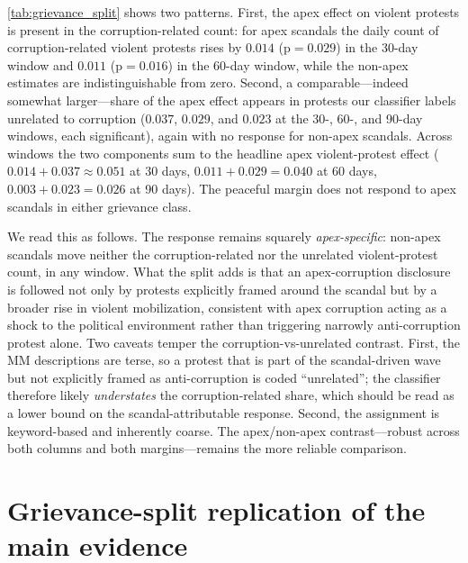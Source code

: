 \documentclass[11pt]{article}
\begin{document}
\autoref{tab:grievance_split} shows two patterns. First, the apex effect on violent protests is present in the corruption-related count: for apex scandals the daily count of corruption-related violent protests rises by $0.014$ (p$=0.029$) in the 30-day window and $0.011$ (p$=0.016$) in the 60-day window, while the non-apex estimates are indistinguishable from zero. Second, a comparable---indeed somewhat larger---share of the apex effect appears in protests our classifier labels unrelated to corruption ($0.037$, $0.029$, and $0.023$ at the 30-, 60-, and 90-day windows, each significant), again with no response for non-apex scandals. Across windows the two components sum to the headline apex violent-protest effect ($0.014+0.037\approx0.051$ at 30 days, $0.011+0.029=0.040$ at 60 days, $0.003+0.023=0.026$ at 90 days). The peaceful margin does not respond to apex scandals in either grievance class.

We read this as follows. The response remains squarely \emph{apex-specific}: non-apex scandals move neither the corruption-related nor the unrelated violent-protest count, in any window. What the split adds is that an apex-corruption disclosure is followed not only by protests explicitly framed around the scandal but by a broader rise in violent mobilization, consistent with apex corruption acting as a shock to the political environment rather than triggering narrowly anti-corruption protest alone. Two caveats temper the corruption-vs-unrelated contrast. First, the MM descriptions are terse, so a protest that is part of the scandal-driven wave but not explicitly framed as anti-corruption is coded ``unrelated''; the classifier therefore likely \emph{understates} the corruption-related share, which should be read as a lower bound on the scandal-attributable response. Second, the assignment is keyword-based and inherently coarse. The apex/non-apex contrast---robust across both columns and both margins---remains the more reliable comparison.

\clearpage
\section{Grievance-split replication of the main evidence}\label{sup:grievance_repl}
\end{document}
